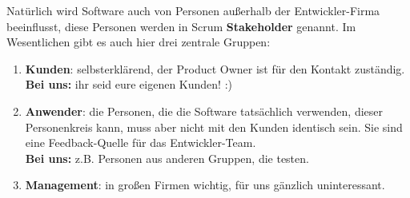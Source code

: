 \documentclass{article}
\begin{document}
Natürlich wird Software auch von Personen außerhalb der Entwickler-Firma beeinflusst, diese Personen werden in Scrum \textbf{Stakeholder} genannt. Im Wesentlichen gibt es auch hier drei zentrale Gruppen:
\begin{enumerate}
    \item \textbf{Kunden}: selbsterklärend, der Product Owner ist für den Kontakt zuständig. \\
    \color{purp} \textbf{Bei uns:} \color{black} ihr seid eure eigenen Kunden! :)
    \item \textbf{Anwender}: die Personen, die die Software tatsächlich verwenden, dieser Personenkreis kann, muss aber nicht mit den Kunden identisch sein. Sie sind eine Feedback-Quelle für das Entwickler-Team. \\
    \color{purp} \textbf{Bei uns:} \color{black} z.B. Personen aus anderen Gruppen, die testen.
    \item \textbf{Management}: in großen Firmen wichtig, für uns gänzlich uninteressant.
\end{enumerate}
\end{document}
